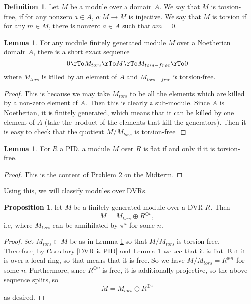 \documentclass[12 pt]{article}
\theoremstyle{definition}
\newtheorem{lemma}[thm]{Lemma}
\newtheorem{propn}[thm]{Proposition}
\newtheorem{defn}[thm]{Definition}
\renewcommand{\(}{\left(}
\renewcommand{\)}{\right)}
\begin{document}
\begin{defn} Let $M$ be a module over a domain $A$. We say that $M$ is \underline{torsion-free}, if for any nonzero $a \in A$, $a:M \to M$ is injective. We say that $M$ is \underline{torsion} if for any $m \in M$, there is nonzero $a \in A$ such that $am=0$.
\end{defn}

\begin{lemma} For any module finitely generated module $M$ over a Noetherian domain $A$, there is a short exact sequence
\[0 \rTo M_{tors} \rTo M \rTo M_{tors-free} \rTo 0\]
where $M_{tors}$ is killed by an element of $A$ and $M_{tors-free}$ is torsion-free.
\label{tors tors-free ses}
\end{lemma}
\begin{proof} This is because we may take $M_{tors}$ to be all the elements which are killed by a non-zero element of $A$. Then this is clearly a sub-module. Since $A$ is Noetherian, it is finitely generated, which means that it can be killed by one element of $A$ (take the product of the elements that kill the generators). Then it is easy to check that the quotient $M/M_{tors}$ is torsion-free.
\end{proof}

\begin{lemma} For $R$ a PID, a module $M$ over $R$ is flat if and only if it is torsion-free.
\label{PID means flat=tors free}
\end{lemma}
\begin{proof} This is the content of Problem 2 on the Midterm.
\end{proof}

Using this, we will classify modules over DVRs.

\begin{propn} let $M$ be a finitely generated module over a DVR $R$. Then
\[M=M_{tors}\oplus R^{\oplus n},\] i.e, where $M_{tors}$ can be annihilated by $\pi^n$ for some $n$.
\end{propn}
\begin{proof}
Set $M_{tors} \subset M$ be as in Lemma \ref{tors tors-free ses} so that $M/M_{tors}$ is torsion-free. Therefore, by Corollary \ref{DVR is PID} and Lemma \ref{PID means flat=tors free} we see that it is flat. But it is over a local ring, so that means that it is free. So we have $M/M_{tors}=R^{\oplus n}$ for some $n$. Furthermore, since $R^{\oplus n}$ is free, it is additionally projective, so the above sequence splits, so
\[M=M_{tors} \oplus R^{\oplus n}\]
as desired.
\end{proof}
\end{document}
